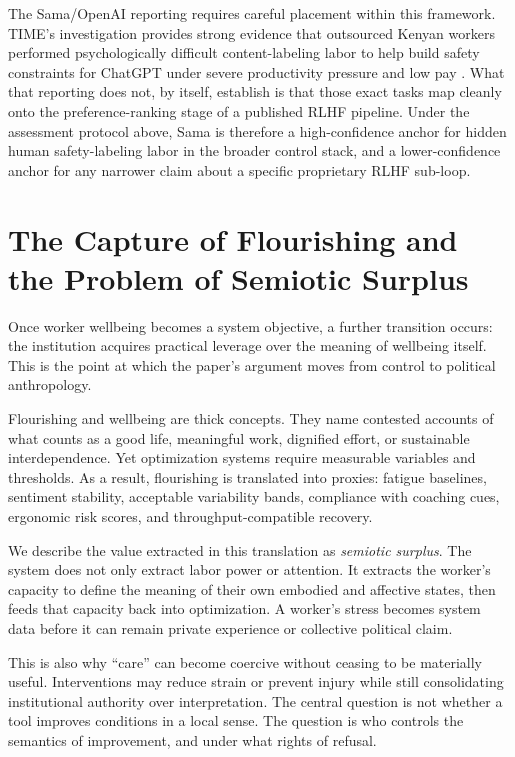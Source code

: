 \documentclass[runningheads]{llncs}
\begin{document}
The Sama/OpenAI reporting requires careful placement within this framework. TIME's investigation provides strong evidence that outsourced Kenyan workers performed psychologically difficult content-labeling labor to help build safety constraints for ChatGPT under severe productivity pressure and low pay \cite{perrigo2023time}. What that reporting does not, by itself, establish is that those exact tasks map cleanly onto the preference-ranking stage of a published RLHF pipeline. Under the assessment protocol above, Sama is therefore a high-confidence anchor for hidden human safety-labeling labor in the broader control stack, and a lower-confidence anchor for any narrower claim about a specific proprietary RLHF sub-loop.

\section{The Capture of Flourishing and the Problem of Semiotic Surplus}

Once worker wellbeing becomes a system objective, a further transition occurs: the institution acquires practical leverage over the meaning of wellbeing itself. This is the point at which the paper's argument moves from control to political anthropology.

Flourishing and wellbeing are thick concepts. They name contested accounts of what counts as a good life, meaningful work, dignified effort, or sustainable interdependence. Yet optimization systems require measurable variables and thresholds. As a result, flourishing is translated into proxies: fatigue baselines, sentiment stability, acceptable variability bands, compliance with coaching cues, ergonomic risk scores, and throughput-compatible recovery.

We describe the value extracted in this translation as \emph{semiotic surplus}. The system does not only extract labor power or attention. It extracts the worker's capacity to define the meaning of their own embodied and affective states, then feeds that capacity back into optimization. A worker's stress becomes system data before it can remain private experience or collective political claim.

This is also why ``care'' can become coercive without ceasing to be materially useful. Interventions may reduce strain or prevent injury while still consolidating institutional authority over interpretation. The central question is not whether a tool improves conditions in a local sense. The question is who controls the semantics of improvement, and under what rights of refusal.
\end{document}
